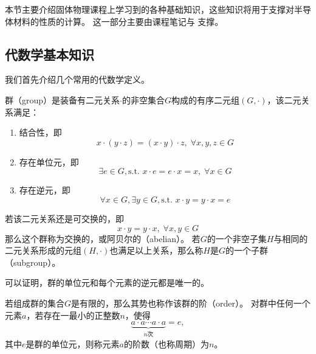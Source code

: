 
本节主要介绍固体物理课程上学习到的各种基础知识，这些知识将用于支撑对半导体材料的性质的计算。
这一部分主要由课程笔记与 \cite{solidphysics2014huang} 支撑。

\subsection{代数学基本知识}

我们首先介绍几个常用的代数学定义。

\begin{definition}
    群（group）是装备有二元关系$\cdot$的非空集合$G$构成的有序二元组$(G, \cdot)$，该二元关系满足：
    \begin{enumerate}[nosep]
        \item 结合性，即
            \begin{equation}x\cdot ( y \cdot z) = (x \cdot y) \cdot z, \; \forall x,y,z \in G\end{equation}
        \item 存在单位元，即
            \begin{equation}\exists e \in G, \text{s.t. } x \cdot e = e\cdot x = x, \; \forall x \in G\end{equation}
        \item 存在逆元，即
            \begin{equation}\forall x \in G, \exists y \in G, \text{s.t. } x \cdot y = y \cdot x = e\end{equation}
    \end{enumerate}
    若该二元关系还是可交换的，即
    \begin{equation}x \cdot y = y \cdot x, \; \forall x, y \in G\end{equation}
    那么这个群称为交换的，或阿贝尔的（abelian）。
    若$G$的一个非空子集$H$与相同的二元关系形成的元组$(H,\cdot)$也满足以上关系，那么称$H$是$G$的一个子群（subgroup）。
\end{definition}

可以证明，群的单位元和每个元素的逆元都是唯一的。

\begin{definition}
    若组成群的集合$G$是有限的，那么其势也称作该群的阶（order）。
    对群中任何一个元素$a$，若存在一最小的正整数$n$，使得
    \begin{equation}
        \underbrace{a\cdot a \cdots a \cdot a}_{n \text{次}} = e,
    \end{equation}
    其中$e$是群的单位元，则称元素$a$的阶数（也称周期）为$n$。
\end{definition}


